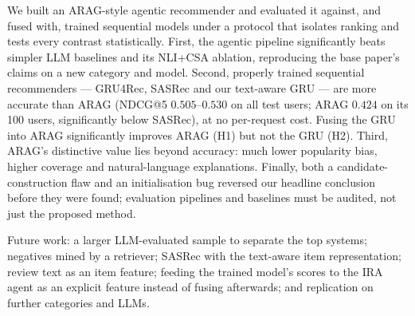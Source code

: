 \documentclass[11pt,a4paper]{article}
\begin{document}
We built an ARAG-style agentic recommender and evaluated it against, and fused with, trained
sequential models under a protocol that isolates ranking and tests every contrast statistically.
First, the agentic pipeline significantly beats simpler LLM baselines and its NLI+CSA ablation,
reproducing the base paper's claims on a new category and model. Second, properly trained
sequential recommenders --- GRU4Rec, SASRec and our text-aware GRU --- are more accurate than ARAG
(NDCG@5 $0.505$--$0.530$ on all test users; ARAG $0.424$ on its 100 users, significantly below
SASRec), at no per-request cost. Fusing the GRU into ARAG significantly improves ARAG (H1) but not
the GRU (H2). Third, ARAG's distinctive value lies beyond accuracy: much lower popularity bias,
higher coverage and natural-language explanations. Finally, both a candidate-construction flaw
and an initialisation bug reversed our headline conclusion before they were found; evaluation
pipelines and baselines must be audited, not just the proposed method.

Future work: a larger LLM-evaluated sample to separate the top systems; negatives mined by a
retriever; SASRec with the text-aware item representation; review text as an item feature; feeding
the trained model's scores to the IRA agent as an explicit feature instead of fusing afterwards;
and replication on further categories and LLMs.
\end{document}
